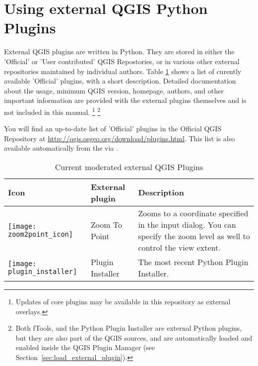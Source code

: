 
\section{Using external QGIS Python Plugins}\label{sec:external_plugins}


External QGIS plugins are written in Python. They are stored in either 
the 'Official' or 'User contributed' QGIS Repostories, or in various other external 
repositories maintained by individual authors. 
Table \ref{tab:external_plugins} shows a list of curently available 'Official' 
plugins, with a short description.
Detailed documentation about the usage, minimum QGIS version, homepage, authors, 
and other important information are provided with the external plugins themselves 
and is not included in this manual.
\footnote{Updates of core plugins may be 
available in this repository as external overlays.} 
\footnote{Both fTools, and the Python Plugin Installer are external Python plugins, 
but they are also part of the QGIS sources, and are automatically loaded and enabled inside
the QGIS Plugin Manager (see Section~\ref{sec:load_external_plugin}).}

You will find an up-to-date list of 'Official' plugins in the Official QGIS 
Repository at \url{http://qgis.osgeo.org/download/plugins.html}. This list is also available 
automatically from the  via .

\begin{table}[H]
\centering
\caption{Current moderated external QGIS Plugins}\label{tab:external_plugins}\medskip
\small
 \begin{tabular}{|l|l|p{4in}|}
\hline \textbf{Icon} & \textbf{External plugin} & \textbf{Description}\\
\hline
\texttt{[image: zoom2point\_icon]}
 & Zoom To Point \index{plugins!Zoom To Point} & Zooms to a coordinate 
  specified in the input dialog. You can specify the zoom level as well to 
  control the view extent.\\
\hline
\texttt{[image: plugin\_installer]}
 & Plugin Installer \index{plugins!Plugin Installer} & The most recent Python Plugin Installer.\\
\hline

\end{tabular}
\end{table}

